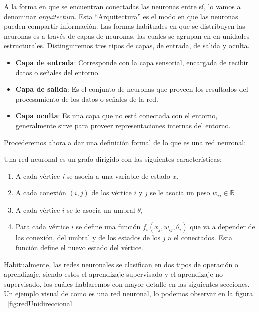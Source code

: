 A la forma en que se encuentran conectadas las neuronas entre sí, lo
vamos a denominar \textsl{\gls{arquitectura}}. Esta ``Arquitectura''
es el modo en que las neuronas pueden compartir información. Las
formas habituales en que se distribuyen las neuronas es a través de
capas de neuronas, las cuales se agrupan en en unidades
estructurales. Distinguiremos tres tipos de capas, de entrada, de
salida y oculta.\\

\begin{itemize}
\item \textbf{Capa de entrada}: Corresponde con la capa sensorial,
  encargada de recibir datos o señales del entorno.
\item \textbf{Capa de salida}: Es el conjunto de neuronas que proveen
  los resultados del procesamiento de los datos o señales de la red.
\item \textbf{Capa oculta}: Es una capa que no está conectada con el
  entorno, generalmente sirve para proveer representaciones internas
  del entorno.
\end{itemize}

Procederemos ahora a dar una definición formal de lo que es una red
neuronal:

\theoremstyle{definition}
\begin{definition}
  Una red neuronal es un grafo dirigido con las siguientes
  características:
  \begin{enumerate}
  \item A cada vértice \textsl{i} se asocia a una variable de estado
    $x_i$
  \item A cada conexión $(i,j)$ de los vértice $i$ y $j$ se le asocia un
    peso $w_{ij} \in \mathbb{R}$
  \item A cada vértice $i$ se le asocia un umbral $\theta_i$
  \item Para cada vértice $i$ se define una función $f_i(x_j, w_{ij},
    \theta_i)$ que va a depender de las conexión, del umbral y de los
    estados de los $j$ a el conectados. Esta función define el nuevo
    estado del vértice.
  \end{enumerate}
\end{definition}

Habitualmente, las redes neuronales se clasifican en dos tipos de
operación o aprendizaje, siendo estos el aprendizaje supervisado y el
aprendizaje no supervisado, los cuáles hablaremos con mayor detalle en
las siguientes secciones. Un ejemplo visual de como es una red
neuronal, lo podemos observar en la figura
~\ref{fig:redUnidireccional}.

